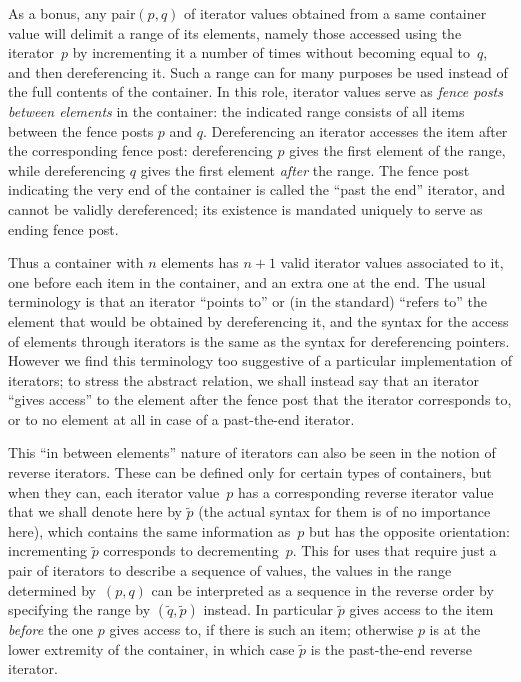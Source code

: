 \documentclass[12pt]{article}
\theoremstyle{plain}
\theoremstyle{definition}
\begin{document}
As a bonus, any pair$(p,q)$ of iterator values obtained from a same container
value will delimit a range of its elements, namely those accessed using the
iterator~$p$ by incrementing it a number of times without becoming equal to~$q$,
and then dereferencing it. Such a range can for many purposes be used instead
of the full contents of the container. In this role, iterator values serve as
\emph{fence posts between elements} in the container: the indicated range
consists of all items between the fence posts $p$ and $q$. Dereferencing an
iterator accesses the item after the corresponding fence post: dereferencing $p$
gives the first element of the range, while dereferencing $q$ gives the first
element \emph{after} the range. The fence post indicating the very end of the
container is called the ``past the end'' iterator, and cannot be validly
dereferenced; its existence is mandated uniquely to serve as ending fence post.

Thus a container with $n$ elements has $n+1$ valid iterator values associated to
it, one before each item in the container, and an extra one at the end. The
usual terminology is that an iterator ``points to'' or (in the standard)
``refers to'' the element that would be obtained by dereferencing it, and the
syntax for the access of elements through iterators is the same as the syntax
for dereferencing pointers. However we find this terminology too suggestive of a
particular implementation of iterators; to stress the abstract relation, we
shall instead say that an iterator ``gives access'' to the element after the
fence post that the iterator corresponds to, or to no element at all in case of
a past-the-end iterator.

This ``in between elements'' nature of iterators can also be seen in the notion
of reverse iterators. These can be defined only for certain types of containers,
but when they can, each iterator value~$p$ has a corresponding reverse iterator
value that we shall denote here by $\tilde p$ (the actual syntax for them is of
no importance here), which contains the same information as~$p$ but has the
opposite orientation: incrementing $\tilde p$ corresponds to decrementing~$p$.
This for uses that require just a pair of iterators to describe a sequence of
values, the values in the range determined by~$(p,q)$ can be interpreted as a
sequence in the reverse order by specifying the range by $(\tilde q,\tilde p)$
instead. In particular $\tilde p$ gives access to the item \emph{before} the one
$p$ gives access to, if there is such an item; otherwise $p$ is at the lower
extremity of the container, in which case $\tilde p$ is the past-the-end reverse
iterator.
\end{document}
